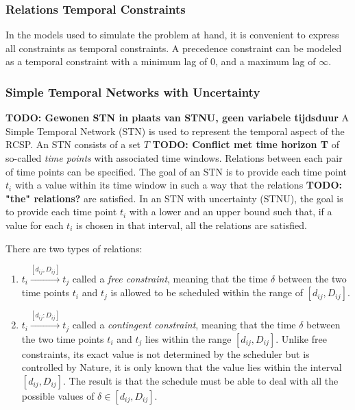 \documentclass{article}
\newcommand{\TODO}[1]{{\color{red}\textbf{TODO: #1}}}
\begin{document}
\subsubsection{Relations Temporal Constraints}
In the models used to simulate the problem at hand, it is convenient to express all constraints as temporal constraints. A precedence constraint can be modeled as a temporal constraint with a minimum lag of $0$, and a maximum lag of $\infty$.

\subsubsection{Simple Temporal Networks with Uncertainty}
\TODO{Gewonen STN in plaats van STNU, geen variabele tijdsduur}
A Simple Temporal Network (STN) is used to represent the temporal aspect of the RCSP. An STN consists of a set $T$ \TODO{Conflict met time horizon T} of so-called \emph{time points} with associated time windows. Relations between each pair of time points can be specified. The goal of an STN is to provide each time point $t_i$ with a value within its time window in such a way that the relations \TODO{"the" relations?} are satisfied. In an STN with uncertainty (STNU), the goal is to provide each time point $t_i$ with a lower and an upper bound such that, if a value for each $t_i$ is chosen in that interval, all the relations are satisfied.

There are two types of relations:
\begin{enumerate}
\item $t_i \xrightarrow{[d_{ij},D_{ij}]} t_j$ called a \emph{free constraint}, meaning that the time $\delta$ between the two time points $t_i$ and $t_j$ is allowed to be scheduled within the range of $[d_{ij},D_{ij}]$.
\item $t_i \xrightarrow{[d_{ij}:D_{ij}]} t_j$ called a \emph{contingent constraint}, meaning that the time $\delta$ between the two time points $t_i$ and $t_j$ lies within the range $[d_{ij},D_{ij}]$. Unlike free constraints, its exact value is not determined by the scheduler but is controlled by Nature, it is only known that the value lies within the interval $[d_{ij},D_{ij}]$. The result is that the schedule must be able to deal with all the possible values of $\delta \in [d_{ij},D_{ij}]$.
\end{enumerate}
\end{document}
